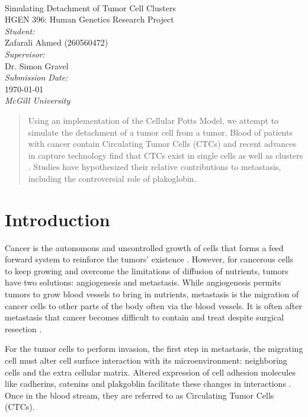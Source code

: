 \documentclass[12pt]{article}
\begin{document}
\begin{titlepage}
	\begin{center}
		~\\[2.5cm]
		{\Huge Simulating Detachment of Tumor Cell Clusters}\\[1.5cm]
		{\Large HGEN 396: Human Genetics Research Project}\\[7.5cm]
		\emph{Student:}\\
		Zafarali Ahmed (260560472)\\[1.0cm]
		\emph{Supervisor:}\\
		Dr. Simon Gravel\\[1.0cm]
		\emph{Submission Date:}\\
		\today\\
		\emph{McGill University}
	\end{center}
\end{titlepage}

\begin{abstract}
Using an implementation of the Cellular Potts Model, we attempt to simulate the detachment of a tumor cell from a tumor. Blood of patients with cancer contain Circulating Tumor Cells (CTCs) and recent advances in capture technology find that CTCs exist in single cells as well as clusters \cite{Aceto2014}. Studies have hypothesized their relative contributions to metastasis, including the controversial role of plakoglobin. 
\end{abstract}

\section{Introduction}
Cancer is the autonomous and uncontrolled growth of cells that forms a feed forward system to reinforce the tumors’ existence \cite{hallmarks}. However, for cancerous cells to keep growing and overcome the limitations of diffusion of nutrients, tumors have two solutions: angiogenesis and metastasis. While angiogenesis permits tumors to grow blood vessels to bring in nutrients, metastasis is the migration of cancer cells to other parts of the body often via the blood vessels. It is often after metastasis that cancer becomes difficult to contain and treat despite surgical resection \cite{Hatzikirou2012}.

For the tumor cells to perform invasion, the first step in metastasis, the migrating cell must alter cell surface interaction with its microenvironment: neighboring cells and the extra cellular matrix. Altered expression of cell adhesion molecules like cadherins, catenins and plakgoblin facilitate these changes in interactions \cite{Aktary2012}. Once in the blood stream, they are referred to as Circulating Tumor Cells (CTCs).
\end{document}
